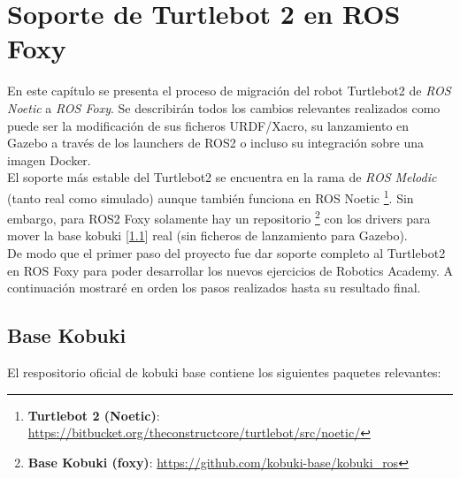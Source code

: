 \chapter{Soporte de Turtlebot 2 en ROS Foxy}
\label{cap:capitulo4}

En este capítulo se presenta el proceso de migración del robot Turtlebot2 de \textit{ROS Noetic} a \textit{ROS Foxy}. Se describirán todos los cambios relevantes realizados como puede ser la modificación de sus ficheros URDF/Xacro, su lanzamiento en Gazebo a través de los launchers de ROS2 o incluso su integración sobre una imagen Docker.\\

El soporte más estable del Turtlebot2 se encuentra en la rama de \textit{ROS Melodic} (tanto real como simulado) aunque también funciona en ROS Noetic \footnote{\textbf{Turtlebot 2 (Noetic)}: \url{https://bitbucket.org/theconstructcore/turtlebot/src/noetic/}}. Sin embargo, para ROS2 Foxy solamente hay un repositorio \footnote{\textbf{Base Kobuki (foxy)}: \url{https://github.com/kobuki-base/kobuki_ros}} con los drivers para mover la base kobuki [\ref{sec:kobuki_base}] real (sin  ficheros de lanzamiento para Gazebo).\\

De modo que el primer paso del proyecto fue dar soporte completo al Turtlebot2 en ROS Foxy para poder desarrollar los nuevos ejercicios de Robotics Academy. A continuación mostraré en orden los pasos realizados hasta su resultado final.\\


\section{Base Kobuki}
\label{sec:kobuki_base}

El respositorio oficial de kobuki base contiene los siguientes paquetes relevantes:

